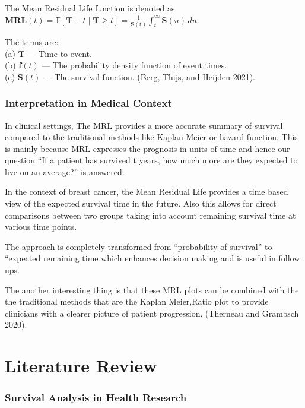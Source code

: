 \documentclass{article}
\begin{document}
The Mean Residual Life function is denoted as \(\mathbf{MRL}(t) = \mathbb{E}[\mathbf{T} - t \mid \mathbf{T} \geq t] = \frac{1}{\mathbf{S}(t)} \int_t^{\infty} \mathbf{S}(u)\,du\).

The terms are:\\
(a) \(\mathbf{T}\) --- Time to event.\\
(b) \(\mathbf{f}(t)\) --- The probability density function of event times.\\
(c) \(\mathbf{S}(t)\) --- The survival function.
(Berg, Thijs, and Heijden 2021).

\subsubsection{Interpretation in Medical Context}\label{interpretation-in-medical-context}

In clinical settings, The MRL provides a more accurate summary of survival compared to the traditional methods like Kaplan Meier or hazard function. This is mainly because MRL expresses the prognosis in units of time and hence our question ``If a patient has survived t years, how much more are they expected to live on an average?'' is answered.

In the context of breast cancer, the Mean Residual Life provides a time based view of the expected survival time in the future. Also this allows for direct comparisons between two groups taking into account remaining survival time at various time points.

The approach is completely transformed from ``probability of survival'' to ``expected remaining time which enhances decision making and is useful in follow ups.

The another interesting thing is that these MRL plots can be combined with the the traditional methods that are the Kaplan Meier,Ratio plot to provide clinicians with a clearer picture of patient progression. (Therneau and Grambsch 2020).

\section{Literature Review}\label{literature-review}

\subsubsection{Survival Analysis in Health Research}\label{survival-analysis-in-health-research}
\end{document}
